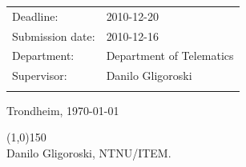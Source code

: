 \begin{titlepage}
\begin{center}
\begin{tabular}{ p{4cm} p{11cm}}
Deadline: & 2010-12-20 \\
Submission date: & 2010-12-16 \\
Department: & Department of Telematics \\
Supervisor: & Danilo Gligoroski \\\\
\end{tabular}
\vspace{0.5cm}

Trondheim, \today 

\vspace{0.4cm}
\line(1,0){150} \\
Danilo Gligoroski, NTNU/ITEM. 

\end{center}
\end{titlepage}

